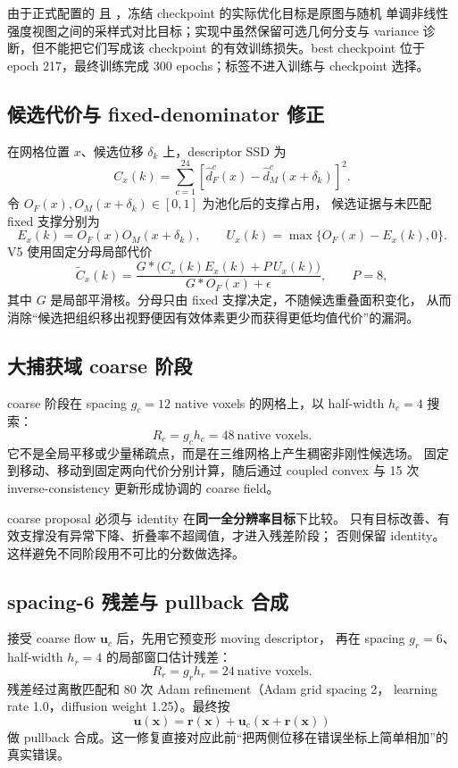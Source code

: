 \documentclass[11pt,a4paper]{ctexart}
\begin{document}
由于正式配置的  且
，冻结 checkpoint 的实际优化目标是原图与随机
单调非线性强度视图之间的采样式对比目标；实现中虽然保留可选几何分支与 variance
诊断，但不能把它们写成该 checkpoint 的有效训练损失。best checkpoint 位于
epoch 217，最终训练完成 300 epochs；标签不进入训练与 checkpoint 选择。

\subsection{候选代价与 fixed-denominator 修正}
在网格位置 $x$、候选位移 $\delta_k$ 上，descriptor SSD 为
\[
C_x(k)=\sum_{c=1}^{24}
\left[\hat d_F^c(x)-\hat d_M^c(x+\delta_k)\right]^2.
\]
令 $O_F(x),O_M(x+\delta_k)\in[0,1]$ 为池化后的支撑占用，
候选证据与未匹配 fixed 支撑分别为
\[
E_x(k)=O_F(x)O_M(x+\delta_k),\qquad
U_x(k)=\max\{O_F(x)-E_x(k),0\}.
\]
V5 使用固定分母局部代价
\[
\widetilde C_x(k)=
\frac{G*\big(C_x(k)E_x(k)+P\,U_x(k)\big)}
     {G*O_F(x)+\epsilon},
\qquad P=8,
\]
其中 $G$ 是局部平滑核。分母只由 fixed 支撑决定，不随候选重叠面积变化，
从而消除“候选把组织移出视野便因有效体素更少而获得更低均值代价”的漏洞。

\subsection{大捕获域 coarse 阶段}
coarse 阶段在 spacing $g_c=12$ native voxels 的网格上，以 half-width
$h_c=4$ 搜索：
\[
R_c=g_ch_c=48\ \text{native voxels}.
\]
它不是全局平移或少量稀疏点，而是在三维网格上产生稠密非刚性候选场。
固定到移动、移动到固定两向代价分别计算，随后通过 coupled convex 与
15 次 inverse-consistency 更新形成协调的 coarse field。

coarse proposal 必须与 identity 在\textbf{同一全分辨率目标}下比较。
只有目标改善、有效支撑没有异常下降、折叠率不超阈值，才进入残差阶段；
否则保留 identity。这样避免不同阶段用不可比的分数做选择。

\subsection{spacing-6 残差与 pullback 合成}
接受 coarse flow $\mathbf{u}_c$ 后，先用它预变形 moving descriptor，
再在 spacing $g_r=6$、half-width $h_r=4$ 的局部窗口估计残差：
\[
R_r=g_rh_r=24\ \text{native voxels}.
\]
残差经过离散匹配和 80 次 Adam refinement（Adam grid spacing 2，
learning rate 1.0，diffusion weight 1.25）。最终按
\[
\mathbf{u}(\mathbf{x})
=\mathbf{r}(\mathbf{x})
+\mathbf{u}_c(\mathbf{x}+\mathbf{r}(\mathbf{x}))
\]
做 pullback 合成。这一修复直接对应此前“把两侧位移在错误坐标上简单相加”的
真实错误。
\end{document}
